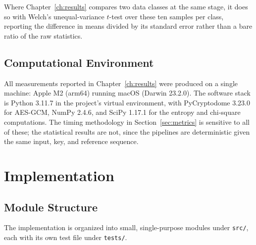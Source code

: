 \documentclass[12pt,a4paper,twoside]{report}
\numberwithin{equation}{chapter}
\begin{document}
Where Chapter~\ref{ch:results} compares two data classes at the same
stage, it does so with Welch's unequal-variance $t$-test over these ten
samples per class, reporting the difference in means divided by its
standard error rather than a bare ratio of the raw statistics.

\section{Computational Environment}
\label{sec:environment}
All measurements reported in Chapter~\ref{ch:results} were produced on
a single machine: Apple M2 (arm64) running macOS (Darwin 23.2.0). The
software stack is Python 3.11.7 in the project's virtual environment,
with PyCryptodome 3.23.0 for AES-GCM, NumPy 2.4.6, and SciPy 1.17.1 for
the entropy and chi-square computations. The timing methodology in
Section~\ref{sec:metrics} is sensitive to all of these; the statistical
results are not, since the pipelines are deterministic given the same
input, key, and reference sequence.

\chapter{Implementation}
\label{ch:implementation}

\section{Module Structure}
\label{sec:module-structure}
The implementation is organized into small, single-purpose modules
under \texttt{src/}, each with its own test file under \texttt{tests/}.
\end{document}
